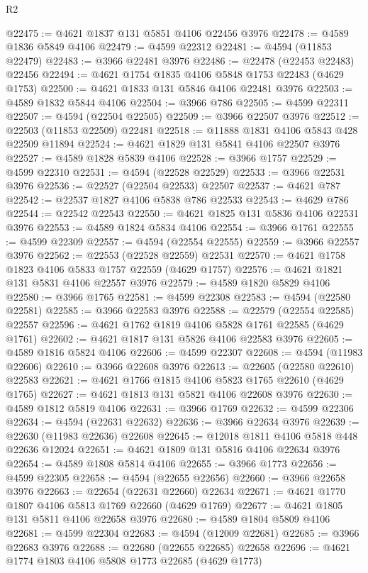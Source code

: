 \begin{lexlean}{R2}
\begin{coremodule}
@22475 := @4621 @1837 @131 @5851 @4106 @22456 @3976
@22478 := @4589 @1836 @5849 @4106
@22479 := @4599 @22312
@22481 := @4594 (@11853 @22479)
@22483 := @3966 @22481 @3976
@22486 := @22478 (@22453 @22483) @22456
@22494 := @4621 @1754 @1835 @4106 @5848 @1753 @22483 (@4629 @1753)
@22500 := @4621 @1833 @131 @5846 @4106 @22481 @3976
@22503 := @4589 @1832 @5844 @4106
@22504 := @3966 @786
@22505 := @4599 @22311
@22507 := @4594 (@22504 @22505)
@22509 := @3966 @22507 @3976
@22512 := @22503 (@11853 @22509) @22481
@22518 := @11888 @1831 @4106 @5843 @428 @22509 @11894
@22524 := @4621 @1829 @131 @5841 @4106 @22507 @3976
@22527 := @4589 @1828 @5839 @4106
@22528 := @3966 @1757
@22529 := @4599 @22310
@22531 := @4594 (@22528 @22529)
@22533 := @3966 @22531 @3976
@22536 := @22527 (@22504 @22533) @22507
@22537 := @4621 @787
@22542 := @22537 @1827 @4106 @5838 @786 @22533
@22543 := @4629 @786
@22544 := @22542 @22543
@22550 := @4621 @1825 @131 @5836 @4106 @22531 @3976
@22553 := @4589 @1824 @5834 @4106
@22554 := @3966 @1761
@22555 := @4599 @22309
@22557 := @4594 (@22554 @22555)
@22559 := @3966 @22557 @3976
@22562 := @22553 (@22528 @22559) @22531
@22570 := @4621 @1758 @1823 @4106 @5833 @1757 @22559 (@4629 @1757)
@22576 := @4621 @1821 @131 @5831 @4106 @22557 @3976
@22579 := @4589 @1820 @5829 @4106
@22580 := @3966 @1765
@22581 := @4599 @22308
@22583 := @4594 (@22580 @22581)
@22585 := @3966 @22583 @3976
@22588 := @22579 (@22554 @22585) @22557
@22596 := @4621 @1762 @1819 @4106 @5828 @1761 @22585 (@4629 @1761)
@22602 := @4621 @1817 @131 @5826 @4106 @22583 @3976
@22605 := @4589 @1816 @5824 @4106
@22606 := @4599 @22307
@22608 := @4594 (@11983 @22606)
@22610 := @3966 @22608 @3976
@22613 := @22605 (@22580 @22610) @22583
@22621 := @4621 @1766 @1815 @4106 @5823 @1765 @22610 (@4629 @1765)
@22627 := @4621 @1813 @131 @5821 @4106 @22608 @3976
@22630 := @4589 @1812 @5819 @4106
@22631 := @3966 @1769
@22632 := @4599 @22306
@22634 := @4594 (@22631 @22632)
@22636 := @3966 @22634 @3976
@22639 := @22630 (@11983 @22636) @22608
@22645 := @12018 @1811 @4106 @5818 @448 @22636 @12024
@22651 := @4621 @1809 @131 @5816 @4106 @22634 @3976
@22654 := @4589 @1808 @5814 @4106
@22655 := @3966 @1773
@22656 := @4599 @22305
@22658 := @4594 (@22655 @22656)
@22660 := @3966 @22658 @3976
@22663 := @22654 (@22631 @22660) @22634
@22671 := @4621 @1770 @1807 @4106 @5813 @1769 @22660 (@4629 @1769)
@22677 := @4621 @1805 @131 @5811 @4106 @22658 @3976
@22680 := @4589 @1804 @5809 @4106
@22681 := @4599 @22304
@22683 := @4594 (@12009 @22681)
@22685 := @3966 @22683 @3976
@22688 := @22680 (@22655 @22685) @22658
@22696 := @4621 @1774 @1803 @4106 @5808 @1773 @22685 (@4629 @1773)

\end{coremodule}
\end{lexlean}
